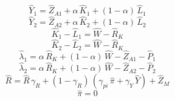 \begin{dmath}
{{\hat{Y}_{1}}}={{\hat{Z}_{A1}}}+{{\alpha}}\, {{\hat{K}_{1}}}+\left(1-{{\alpha}}\right)\, {{\hat{L}_{1}}}
\end{dmath}
\begin{dmath}
{{\hat{Y}_{2}}}={{\hat{Z}_{A2}}}+{{\alpha}}\, {{\hat{K}_{2}}}+\left(1-{{\alpha}}\right)\, {{\hat{L}_{2}}}
\end{dmath}
\begin{dmath}
{{\hat{K}_{1}}}-{{\hat{L}_{1}}}={{\hat{W}}}-{{\hat{R}_{K}}}
\end{dmath}
\begin{dmath}
{{\hat{K}_{2}}}-{{\hat{L}_{2}}}={{\hat{W}}}-{{\hat{R}_{K}}}
\end{dmath}
\begin{dmath}
{{\hat{\lambda}_{1}}}={{\alpha}}\, {{\hat{R}_{K}}}+\left(1-{{\alpha}}\right)\, {{\hat{W}}}-{{\hat{Z}_{A1}}}-{{\hat{P}_{1}}}
\end{dmath}
\begin{dmath}
{{\hat{\lambda}_{2}}}={{\alpha}}\, {{\hat{R}_{K}}}+\left(1-{{\alpha}}\right)\, {{\hat{W}}}-{{\hat{Z}_{A2}}}-{{\hat{P}_{2}}}
\end{dmath}
\begin{dmath}
{{\hat{R}}}={{\hat{R}}}\, {{\gamma_{R}}}+\left(1-{{\gamma_{R}}}\right)\, \left({{\gamma_{pi}}}\, {{\hat{\pi}}}+{{\gamma_{Y}}}\, {{\hat{Y}}}\right)+{{\hat{Z}_M}}
\end{dmath}
\begin{dmath}
{{\hat{\pi}}}=0
\end{dmath}
